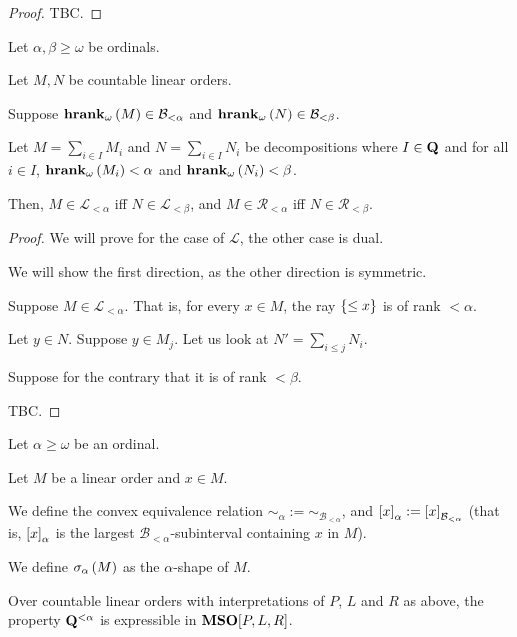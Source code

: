 \begin{proof}
  TBC.
\end{proof}

\begin{lemma}
  Let $\alpha, \beta \ge \omega$ be ordinals.

  Let $M, N$ be countable linear orders.

  Suppose $\mathbf{hrank}_{\omega}\left( M \right) \in \mathcal{B}_{< \alpha}$ and $\mathbf{hrank}_{\omega}\left( N \right) \in \mathcal{B}_{< \beta}$.

  Let $M = \sum_{i \in I} M_i$ and $N = \sum_{i \in I} N_i$ be decompositions
  where $I \in \mathbf{Q}$ and for all $i \in I$, $\mathbf{hrank}_{\omega}\left( M_i \right) < \alpha$
  and $\mathbf{hrank}_{\omega}\left( N_i \right) < \beta$.

  Then, $M \in \mathcal{L}_{< \alpha}$ iff $N \in \mathcal{L}_{< \beta}$,
  and $M \in \mathcal{R}_{< \alpha}$ iff $N \in \mathcal{R}_{< \beta}$.
\end{lemma}

\begin{proof}
  We will prove for the case of $\mathcal{L}$, the other case is dual.

  We will show the first direction, as the other direction is symmetric.

  Suppose $M \in \mathcal{L}_{< \alpha}$.
  That is, for every $x \in M$, the ray $\left\{ {\le x} \right\}$ is of rank $< \alpha$.

  Let $y \in N$. Suppose $y \in M_j$. Let us look at
  $N' = \sum_{i \le j} N_i$.

  Suppose for the contrary that it is of rank $< \beta$.

  TBC.
\end{proof}

\begin{definition}
  Let $\alpha \ge \omega$ be an ordinal.

  Let $M$ be a linear order and $x \in M$.

  We define the convex equivalence relation $\sim_\alpha := \sim_{\mathcal{B}_{< \alpha}}$,
  and $\left[ {x} \right]_{\alpha} := \left[ {x} \right]_{\mathcal{B}_{< \alpha}}$ (that is,
  $\left[ {x} \right]_{\alpha}$ is the largest $\mathcal{B}_{< \alpha}$-subinterval
  containing $x$ in $M$).

  We define $\sigma_{\alpha} \left( {M} \right)$ as 
  the $\alpha$-shape of $M$.
\end{definition}


\begin{lemma}
  Over countable linear orders with interpretations of $P$, $L$ and $R$ as above, the property
  $\mathbf{Q}^{< \alpha}$ is expressible in $\mathbf{MSO}[P, L, R]$.
\end{lemma}


